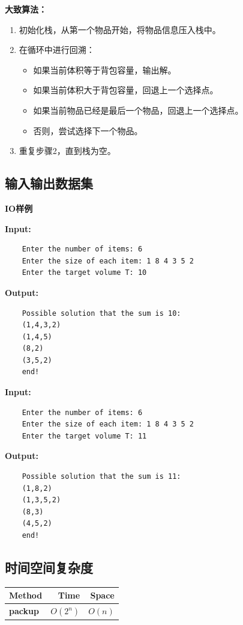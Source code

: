 \documentclass[UTF8]{ctexart}
\begin{document}
\textbf{大致算法：}
    \begin{enumerate}
        \item 初始化栈，从第一个物品开始，将物品信息压入栈中。
        \item 在循环中进行回溯：
          \begin{itemize}
            \item 如果当前体积等于背包容量，输出解。
            \item 如果当前体积大于背包容量，回退上一个选择点。
            \item 如果当前物品已经是最后一个物品，回退上一个选择点。
            \item 否则，尝试选择下一个物品。
          \end{itemize}
        \item 重复步骤2，直到栈为空。
      \end{enumerate}



\subsection*{输入输出数据集}
\textbf{IO样例}
\begin{exampleframe}
\textbf{Input:}
\begin{verbatim}
    Enter the number of items: 6
    Enter the size of each item: 1 8 4 3 5 2
    Enter the target volume T: 10
\end{verbatim}
\textbf{Output:}
\begin{verbatim}
    Possible solution that the sum is 10:
    (1,4,3,2)
    (1,4,5)
    (8,2)
    (3,5,2)
    end! 
\end{verbatim}
\textbf{Input:}
\begin{verbatim}
    Enter the number of items: 6 
    Enter the size of each item: 1 8 4 3 5 2 
    Enter the target volume T: 11
\end{verbatim}
\textbf{Output:}
\begin{verbatim}
    Possible solution that the sum is 11:
    (1,8,2)
    (1,3,5,2)
    (8,3)
    (4,5,2)
    end!
\end{verbatim}
\end{exampleframe}
    
\subsection*{时间空间复杂度}

\begin{center}
    \begin{tabular}{|l|r|r|} \hline
        Method & Time & Space \\\hline
        \textbf{packup} & $O(2^n)$ & $O(n)$ \\ \hline
    \end{tabular}
\end{center}
\end{document}
